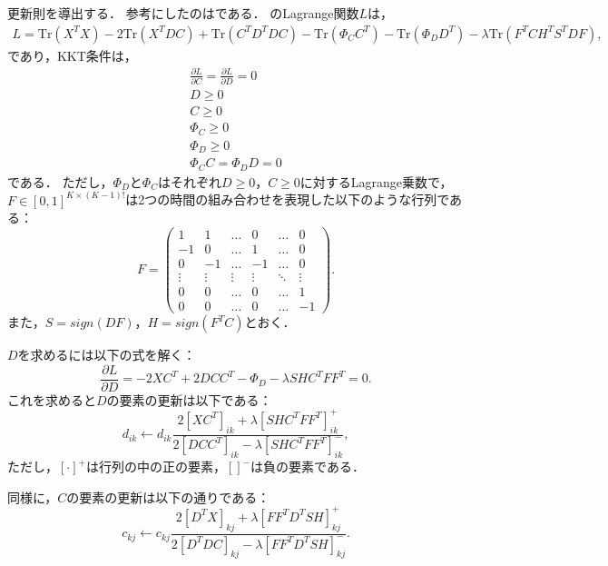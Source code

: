 更新則を導出する．
参考にしたのは\cite{Babaee2016}である．
のLagrange関数$L$は，
\begin{eqnarray}
	L = \text{Tr}(X^TX) - 2 \text{Tr}(X^TDC) + \text{Tr}(C^TD^TDC) - \text{Tr}(\Phi_C C^T) - \text{Tr}(\Phi_D D^T) - \lambda \text{Tr} (F^T C H^T S^T D F),
\end{eqnarray}
であり，KKT条件は，
\begin{eqnarray}
	\frac{\partial L}{\partial C} = \frac{\partial L}{\partial D} = 0 \\
	D \geq 0 \\
	C \geq 0 \\
	\Phi_C \geq 0 \\
	\Phi_D \geq 0 \\
	\Phi_C C = \Phi_D D = 0
\end{eqnarray}
である．
ただし，$\Phi_D$と$\Phi_C$はそれぞれ$D \geq 0$，$C \geq 0$に対するLagrange乗数で，$F \in [0,1]^{K \times (K-1)!}$は2つの時間の組み合わせを表現した以下のような行列である：
\begin{equation}
	F = \left(
    \begin{array}{cccccc}
			1 & 1 & \ldots & 0 & \ldots & 0 \\
			-1 & 0 & \ldots & 1 & \ldots & 0 \\
			0 & -1 & \ldots & -1 & \ldots & 0 \\
			\vdots & \vdots & \vdots & \vdots & \ddots & \vdots \\
			0 & 0 & \ldots & 0 & \ldots & 1 \\
			0 & 0 & \ldots & 0 & \ldots & -1
    \end{array}
  \right).
\end{equation}
また，$S = sign(DF)$，$H = sign(F^TC)$とおく．

$D$を求めるには以下の式を解く：
\begin{equation}
	\frac{\partial L}{\partial D} = - 2 X C^T + 2 DCC^T - \Phi_D - \lambda SHC^T FF^T = 0.
\end{equation}
これを求めると$D$の要素の更新は以下である：
\begin{equation}
	d_{ik} \leftarrow d_{ik} \frac{2[XC^T]_{ik} + \lambda [SHC^T FF^T]_{ik}^+}{2[DCC^T]_{ik} - \lambda [SHC^T FF^T]_{ik}^-},
\end{equation}
ただし，$[\cdot]^+$は行列の中の正の要素，$[]^-$は負の要素である．

同様に，$C$の要素の更新は以下の通りである：
\begin{equation}
	c_{kj} \leftarrow c_{kj} \frac{2[D^T X]_{kj} + \lambda [FF^T D^T SH]_{kj}^+}{2[D^T DC]_{kj} - \lambda [FF^T D^T SH]_{kj}^-}.
\end{equation}

